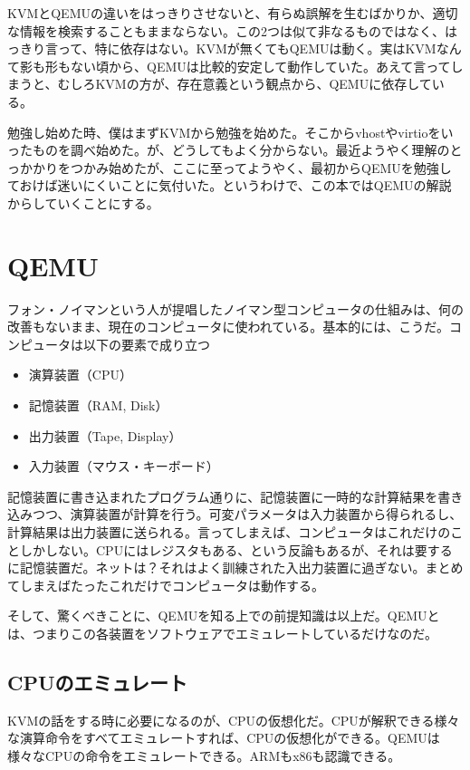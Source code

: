 \documentclass[9pt,b5paper,tombo]{jsbook}
\begin{document}
KVMとQEMUの違いをはっきりさせないと、有らぬ誤解を生むばかりか、適切な情報を検索することもままならない。この2つは似て非なるものではなく、はっきり言って、特に依存はない。KVMが無くてもQEMUは動く。実はKVMなんて影も形もない頃から、QEMUは比較的安定して動作していた。あえて言ってしまうと、むしろKVMの方が、存在意義という観点から、QEMUに依存している。

勉強し始めた時、僕はまずKVMから勉強を始めた。そこからvhostやvirtioをいったものを調べ始めた。が、どうしてもよく分からない。最近ようやく理解のとっかかりをつかみ始めたが、ここに至ってようやく、最初からQEMUを勉強しておけば迷いにくいことに気付いた。というわけで、この本ではQEMUの解説からしていくことにする。

\section{QEMU}

フォン・ノイマンという人が提唱したノイマン型コンピュータの仕組みは、何の改善もないまま、現在のコンピュータに使われている。基本的には、こうだ。コンピュータは以下の要素で成り立つ

\begin{itemize}
  \item 演算装置（CPU）
  \item 記憶装置（RAM, Disk）
  \item 出力装置（Tape, Display）
  \item 入力装置（マウス・キーボード）
\end{itemize}

記憶装置に書き込まれたプログラム通りに、記憶装置に一時的な計算結果を書き込みつつ、演算装置が計算を行う。可変パラメータは入力装置から得られるし、計算結果は出力装置に送られる。言ってしまえば、コンピュータはこれだけのことしかしない。CPUにはレジスタもある、という反論もあるが、それは要するに記憶装置だ。ネットは？それはよく訓練された入出力装置に過ぎない。まとめてしまえばたったこれだけでコンピュータは動作する。

そして、驚くべきことに、QEMUを知る上での前提知識は以上だ。QEMUとは、つまりこの各装置をソフトウェアでエミュレートしているだけなのだ。

\subsection{CPUのエミュレート}

KVMの話をする時に必要になるのが、CPUの仮想化だ。CPUが解釈できる様々な演算命令をすべてエミュレートすれば、CPUの仮想化ができる。QEMUは様々なCPUの命令をエミュレートできる。ARMもx86も認識できる。
\end{document}

